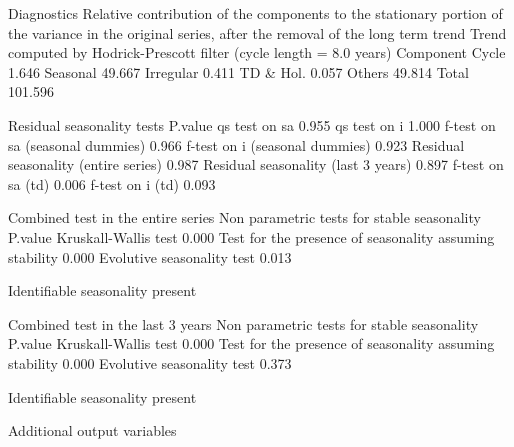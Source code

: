 \documentclass[article]{jss}
\begin{document}
\begin{CodeChunk}
\begin{CodeOutput}
Diagnostics
 Relative contribution of the components to the stationary portion of the variance in the original series, after the removal of the long term trend 
 Trend computed by Hodrick-Prescott filter (cycle length = 8.0 years)
           Component
 Cycle         1.646
 Seasonal     49.667
 Irregular     0.411
 TD & Hol.     0.057
 Others       49.814
 Total       101.596

 Residual seasonality tests 
                                      P.value
 qs test on sa                          0.955
 qs test on i                           1.000
 f-test on sa (seasonal dummies)        0.966
 f-test on i (seasonal dummies)         0.923
 Residual seasonality (entire series)   0.987
 Residual seasonality (last 3 years)    0.897
 f-test on sa (td)                      0.006
 f-test on i (td)                       0.093

 Combined test in the entire series 
 Non parametric tests for stable seasonality
                                                          P.value
   Kruskall-Wallis test                                      0.000
   Test for the presence of seasonality assuming stability   0.000
   Evolutive seasonality test                                0.013
 
 Identifiable seasonality present

 Combined test in the last 3 years 
 Non parametric tests for stable seasonality
                                                          P.value
   Kruskall-Wallis test                                      0.000
   Test for the presence of seasonality assuming stability   0.000
   Evolutive seasonality test                                0.373
 
 Identifiable seasonality present


Additional output variables
\end{CodeOutput}
\end{CodeChunk}
\end{document}
